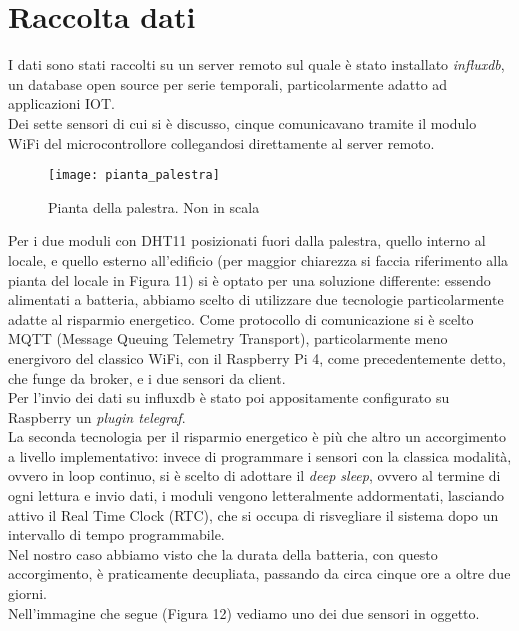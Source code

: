 \documentclass[fleqn,10pt]{SelfArx} %
\begin{document}
\section{Raccolta dati}

I dati sono stati raccolti su un server remoto sul quale è stato installato \textit{influxdb}, un database open source 
per serie temporali, particolarmente adatto ad applicazioni IOT.\\

Dei sette sensori di cui si è discusso, cinque comunicavano tramite il modulo WiFi del microcontrollore collegandosi 
direttamente al server remoto.\\

\begin{figure}[htb!]\centering
	\texttt{[image: pianta\_palestra]}
	\caption{Pianta della palestra. Non in scala}
	\label{fig:pianta palestra}
\end{figure}

Per i due moduli con DHT11 posizionati fuori dalla palestra, quello interno al locale, e quello esterno all'edificio 
(per maggior chiarezza si faccia riferimento alla pianta del locale in Figura 11) si è optato per una soluzione 
differente: essendo alimentati a batteria, abbiamo scelto di utilizzare due tecnologie particolarmente adatte al 
risparmio energetico. Come protocollo di comunicazione si è scelto MQTT (Message Queuing Telemetry Transport), 
particolarmente meno energivoro del classico WiFi, con il Raspberry Pi 4, come precedentemente detto, che funge 
da broker, e i due sensori da client. \\
Per l'invio dei dati su influxdb è stato poi appositamente configurato su Raspberry un \textit{plugin telegraf}.\\
La seconda tecnologia per il risparmio energetico è più che altro un accorgimento a livello implementativo: invece di 
programmare i sensori con la classica modalità, ovvero in loop continuo, si è scelto di adottare il \textit{deep sleep}, 
ovvero al termine di ogni lettura e invio dati, i moduli vengono letteralmente addormentati, lasciando attivo il Real 
Time Clock (RTC), che si occupa di risvegliare il sistema dopo un intervallo di tempo programmabile.\\
Nel nostro caso abbiamo visto che la durata della batteria, con questo accorgimento, è praticamente decupliata, 
passando da circa cinque ore a oltre due giorni.\\
Nell'immagine che segue (Figura 12) vediamo uno dei due sensori in oggetto.
\end{document}
